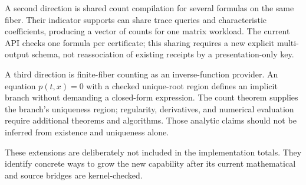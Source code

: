 A second direction is shared count compilation for several formulas on the same fiber. Their indicator supports can share trace queries and characteristic coefficients, producing a vector of counts for one matrix workload. The current API checks one formula per certificate; this sharing requires a new explicit multi-output schema, not reassociation of existing receipts by a presentation-only key.

A third direction is finite-fiber counting as an inverse-function provider. An equation $p(t,x)=0$ with a checked unique-root region defines an implicit branch without demanding a closed-form expression. The count theorem supplies the branch's uniqueness region; regularity, derivatives, and numerical evaluation require additional theorems and algorithms. Those analytic claims should not be inferred from existence and uniqueness alone.

These extensions are deliberately not included in the implementation totals. They identify concrete ways to grow the new capability after its current mathematical and source bridges are kernel-checked.
